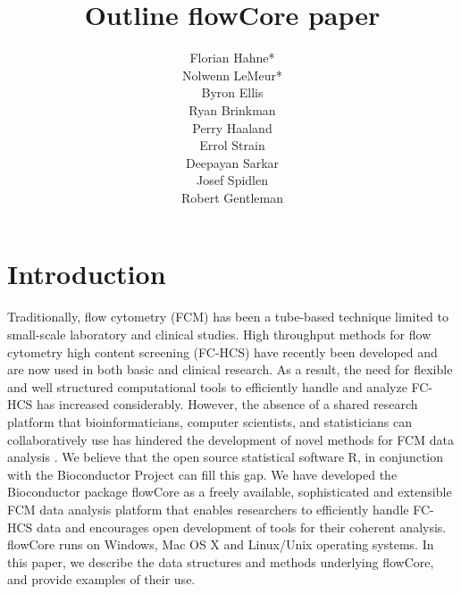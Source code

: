 \documentclass[12pt]{article}
\title{Outline flowCore paper}
\author{Florian Hahne*\\
  Nolwenn LeMeur*\\
  Byron Ellis\\
  Ryan Brinkman\\
  Perry Haaland\\
  Errol Strain\\
  Deepayan Sarkar\\
  Josef Spidlen\\
  Robert Gentleman
 }
\begin{document}
\maketitle

\section*{Introduction}
Traditionally, flow cytometry (FCM) has been a tube-based technique
limited to small-scale laboratory and clinical studies.  High
throughput methods for flow cytometry high content screening (FC-HCS)
have recently been developed and are now used in both basic and
clinical research. As a result, the need for flexible and well
structured computational tools to efficiently handle and analyze
FC-HCS has increased considerably.
However, the absence of a shared research platform that
bioinformaticians, computer scientists, and statisticians can collaboratively
use has hindered the development of novel methods 
for FCM data analysis \citep{lizard2007fca}.
We believe that the open source statistical
software R, in conjunction with the Bioconductor Project can fill this
gap.  
We have developed the Bioconductor package flowCore as a freely available,
sophisticated and extensible FCM data analysis platform that enables
researchers to efficiently handle FC-HCS data and encourages open
development of tools for their coherent analysis. 
flowCore runs on Windows, Mac OS X and Linux/Unix operating
systems.  In this paper, we describe the data structures and methods underlying
flowCore, and provide examples of their use.
\end{document}

